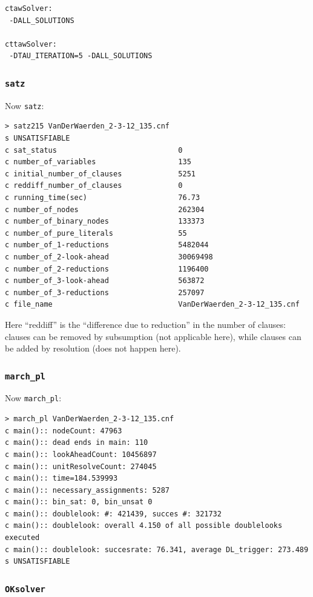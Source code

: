 \documentclass[final,3p,times]{elsarticle}
\theoremstyle{definition}
\newcommand{\oksolver}{\texttt{OKsolver}}
\newcommand{\satz}{\texttt{satz}}
\newcommand{\march}{\texttt{march\_pl}}
\begin{document}
\begin{appendix}
\begin{verbatim}
ctawSolver:
 -DALL_SOLUTIONS

cttawSolver:
 -DTAU_ITERATION=5 -DALL_SOLUTIONS
\end{verbatim}


\subsubsection{\satz}
\label{sec:oklsatz}

Now \satz:
\begin{verbatim}
> satz215 VanDerWaerden_2-3-12_135.cnf
s UNSATISFIABLE
c sat_status                            0
c number_of_variables                   135
c initial_number_of_clauses             5251
c reddiff_number_of_clauses             0
c running_time(sec)                     76.73
c number_of_nodes                       262304
c number_of_binary_nodes                133373
c number_of_pure_literals               55
c number_of_1-reductions                5482044
c number_of_2-look-ahead                30069498
c number_of_2-reductions                1196400
c number_of_3-look-ahead                563872
c number_of_3-reductions                257097
c file_name                             VanDerWaerden_2-3-12_135.cnf
\end{verbatim}
Here ``reddiff'' is the ``difference due to reduction'' in the number of clauses: clauses can be removed by subsumption (not applicable here), while clauses can be added by resolution (does not happen here).


\subsubsection{\march}
\label{sec:oklmarch}

Now \march:
\begin{verbatim}
> march_pl VanDerWaerden_2-3-12_135.cnf
c main():: nodeCount: 47963
c main():: dead ends in main: 110
c main():: lookAheadCount: 10456897
c main():: unitResolveCount: 274045
c main():: time=184.539993
c main():: necessary_assignments: 5287
c main():: bin_sat: 0, bin_unsat 0
c main():: doublelook: #: 421439, succes #: 321732
c main():: doublelook: overall 4.150 of all possible doublelooks executed
c main():: doublelook: succesrate: 76.341, average DL_trigger: 273.489
s UNSATISFIABLE
\end{verbatim}


\subsubsection{\oksolver}
\label{sec:okloks}


\end{appendix}
\end{document}
